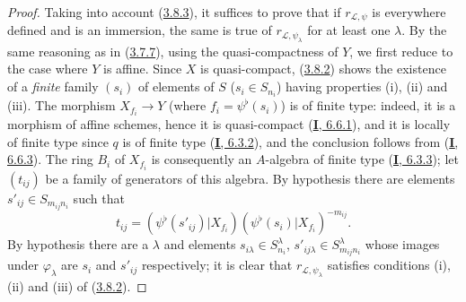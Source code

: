 
\begin{proof}
Taking into account (\hyperref[II.3.8.3]{3.8.3}), it suffices to prove that
if $r_{\mathcal{L},\psi}$ is everywhere defined and is an immersion, the same
is true of $r_{\mathcal{L},\psi_\lambda}$ for at least one $\lambda$. By the
same reasoning as in (\hyperref[II.3.7.7]{3.7.7}), using the
quasi-compactness of $Y$, we first reduce to the case where $Y$ is affine.
Since $X$ is quasi-compact, (\hyperref[II.3.8.2]{3.8.2}) shows the
existence of a \emph{finite} family $(s_i)$ of elements of $S$
($s_i\in S_{n_i}$) having properties (i), (ii) and (iii). The morphism
$X_{f_i}\to Y$ (where $f_i=\psi^\flat(s_i)$) is of finite type: indeed, it
is a morphism of affine schemes, hence it is quasi-compact
(\hyperref[I.6.6.1]{\textbf{I}, 6.6.1}), and it is locally of finite type since $q$
is of finite type (\hyperref[I.6.3.2]{\textbf{I}, 6.3.2}), and the conclusion follows
from (\hyperref[I.6.6.3]{\textbf{I}, 6.6.3}). The ring $B_i$ of $X_{f_i}$ is
consequently an $A$-algebra of finite type (\hyperref[I.6.3.3]{\textbf{I}, 6.3.3});
let $(t_{ij})$ be a family of generators of this algebra. By hypothesis
there are elements $s'_{ij}\in S_{m_{ij}n_i}$ such that
\[
  t_{ij}=(\psi^\flat(s'_{ij})|X_{f_i})
  (\psi^\flat(s_i)|X_{f_i})^{-m_{ij}}.
\]
By hypothesis there are a $\lambda$ and elements
$s_{i\lambda}\in S_{n_i}^\lambda$,
$s'_{ij\lambda}\in S_{m_{ij}n_i}^\lambda$ whose images under
$\varphi_\lambda$ are $s_i$ and $s'_{ij}$ respectively; it is clear that
$r_{\mathcal{L},\psi_\lambda}$ satisfies conditions (i), (ii) and (iii) of
(\hyperref[II.3.8.2]{3.8.2}).
\end{proof}

